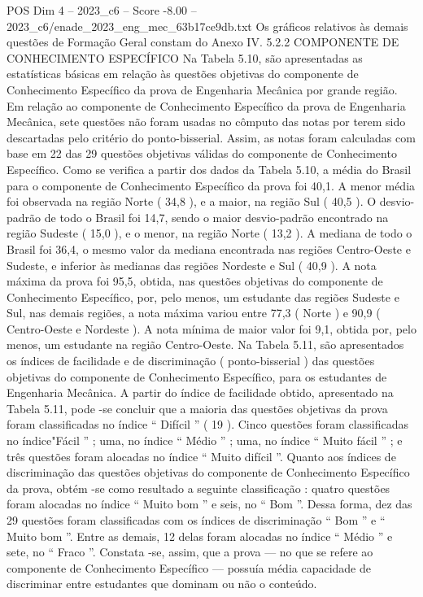 \begin{textsample}{POS Dim 4 – 2023\_c6 – Score -8.00 – 2023\_c6/enade\_2023\_eng\_mec\_63b17ce9db.txt}
Os gráficos relativos às demais questões de Formação Geral constam do Anexo IV. 5.2.2 COMPONENTE DE CONHECIMENTO ESPECÍFICO Na Tabela 5.10, são apresentadas as estatísticas básicas em relação às questões objetivas do componente de Conhecimento Específico da prova de Engenharia Mecânica por grande região.
Em relação ao componente de Conhecimento Específico da prova de Engenharia Mecânica, sete questões não foram usadas no cômputo das notas por terem sido descartadas pelo critério do ponto-bisserial.
Assim, as notas foram calculadas com base em 22 das 29 questões objetivas válidas do componente de Conhecimento Específico.
Como se verifica a partir dos dados da Tabela 5.10, a média do Brasil para o componente de Conhecimento Específico da prova foi 40,1.
A menor média foi observada na região Norte ( 34,8 ), e a maior, na região Sul ( 40,5 ).
O desvio-padrão de todo o Brasil foi 14,7, sendo o maior desvio-padrão encontrado na região Sudeste ( 15,0 ), e o menor, na região Norte ( 13,2 ).
A mediana de todo o Brasil foi 36,4, o mesmo valor da mediana encontrada nas regiões Centro-Oeste e Sudeste, e inferior às medianas das regiões Nordeste e Sul ( 40,9 ).
A nota máxima da prova foi 95,5, obtida, nas questões objetivas do componente de Conhecimento Específico, por, pelo menos, um estudante das regiões Sudeste e Sul, nas demais regiões, a nota máxima variou entre 77,3 ( Norte ) e 90,9 ( Centro-Oeste e Nordeste ).
A nota mínima de maior valor foi 9,1, obtida por, pelo menos, um estudante na região Centro-Oeste.
Na Tabela 5.11, são apresentados os índices de facilidade e de discriminação ( ponto-bisserial ) das questões objetivas do componente de Conhecimento Específico, para os estudantes de Engenharia Mecânica.
A partir do índice de facilidade obtido, apresentado na Tabela 5.11, pode -se concluir que a maioria das questões objetivas da prova foram classificadas no índice “ Difícil ” ( 19 ).
Cinco questões foram classificadas no índice"Fácil ” ; uma, no índice “ Médio ” ; uma, no índice “ Muito fácil ” ; e três questões foram alocadas no índice “ Muito difícil ”.
Quanto aos índices de discriminação das questões objetivas do componente de Conhecimento Específico da prova, obtém -se como resultado a seguinte classificação : quatro questões foram alocadas no índice “ Muito bom ” e seis, no “ Bom ”.
Dessa forma, dez das 29 questões foram classificadas com os índices de discriminação “ Bom ” e “ Muito bom ”.
Entre as demais, 12 delas foram alocadas no índice “ Médio ” e sete, no “ Fraco ”.
Constata -se, assim, que a prova — no que se refere ao componente de Conhecimento Específico — possuía média capacidade de discriminar entre estudantes que dominam ou não o conteúdo.

\end{textsample}
